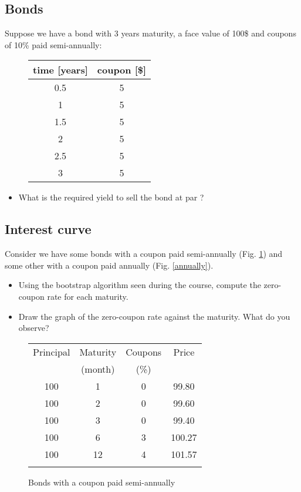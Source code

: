 \subsection*{Bonds}

Suppose we have a bond with 3 years maturity, a face value of 100\$ and coupons of 10\% paid semi-annually:

\begin{figure}[h!]
\centering
\begin{tabular}{c|c}
time [years] & coupon [\$] \\
\hline
0.5 & 5 \\
1 & 5 \\
1.5 & 5 \\
2 & 5 \\
2.5 & 5 \\
3 & 5 \\
\end{tabular}

\end{figure}

\begin{itemize}
  \item What is the required yield to sell the bond at par ?
\end{itemize}

\subsection*{Interest curve}

Consider we have some bonds with a coupon paid semi-annually (Fig. \ref{semi}) and some other with a coupon paid annually (Fig. \ref{annually}). 

\begin{itemize}
    \item Using the bootstrap algorithm seen during the course, compute the zero-coupon rate for each maturity.
    \item Draw the graph of the zero-coupon rate against the maturity. What do you observe?
\end{itemize}



\begin{figure}
\centering
\begin{tabular}{cccc}
Principal	&	Maturity 	&	Coupons 	&	Price	\\
 & (month) & (\%) & \\
\hline
100	&	1	&	0	&	99.80	\\
100	&	2	&	0	&	99.60	\\
100	&	3	&	0	&	99.40	\\
100	&	6	&	3	&	100.27	\\
100	&	12	&	4	&	101.57	\\
& & & \\
\end{tabular}
\caption{Bonds with a coupon paid semi-annually}
\label{semi}
\end{figure}


